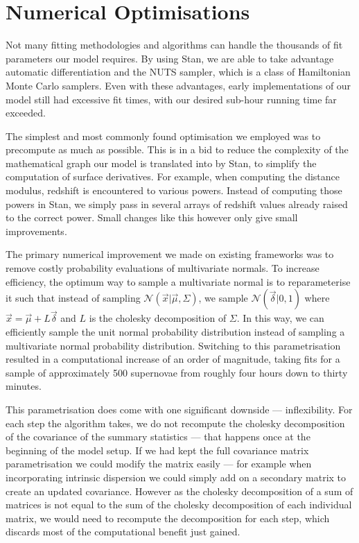 \documentclass[a4paper,fleqn,usenatbib,manuscript]{emulateapj}
\begin{document}
\section{Numerical Optimisations}
\label{app:optimisations}


Not many fitting methodologies and algorithms can handle the thousands of fit parameters our model requires. By using Stan, we are able to take advantage automatic differentiation and the NUTS sampler, which is a class of Hamiltonian Monte Carlo samplers. Even with these advantages, early implementations of our model still had excessive fit times, with our desired sub-hour running time far exceeded. 

The simplest and most commonly found optimisation we employed was to precompute as much as possible. This is in a bid to reduce the complexity of the mathematical graph our model is translated into by Stan, to simplify the computation of surface derivatives. For example, when computing the distance modulus, redshift is encountered to various powers. Instead of computing those powers in Stan, we simply pass in several arrays of redshift values already raised to the correct power. Small changes like this however only give small improvements.

The primary numerical improvement we made on existing frameworks was to remove costly probability evaluations of multivariate normals. To increase efficiency, the optimum way to sample a multivariate normal is to reparameterise it such that instead of sampling $\mathcal{N}(\vec{x}|\vec{\mu}, \Sigma)$, we sample $\mathcal{N}(\vec{\delta}|0,1)$ where $\vec{x} = \vec{\mu} + L \vec{\delta}$ and $L$ is the cholesky decomposition of $\Sigma$. In this way, we can efficiently sample the unit normal probability distribution instead of sampling a multivariate normal probability distribution. Switching to this parametrisation resulted in a computational increase of an order of magnitude, taking fits for a sample of approximately 500 supernovae from roughly four hours down to thirty minutes. 

This parametrisation does come with one significant downside --- inflexibility. For each step the algorithm takes, we do not recompute the cholesky decomposition of the covariance of the summary statistics --- that happens once at the beginning of the model setup. If we had kept the full covariance matrix parametrisation we could modify the matrix easily --- for example when incorporating intrinsic dispersion we could simply add on a secondary matrix to create an updated covariance. However as the cholesky decomposition of a sum of matrices is not equal to the sum of the cholesky decomposition of each individual matrix, we would need to recompute the decomposition for each step, which discards most of the computational benefit just gained.
\end{document}
